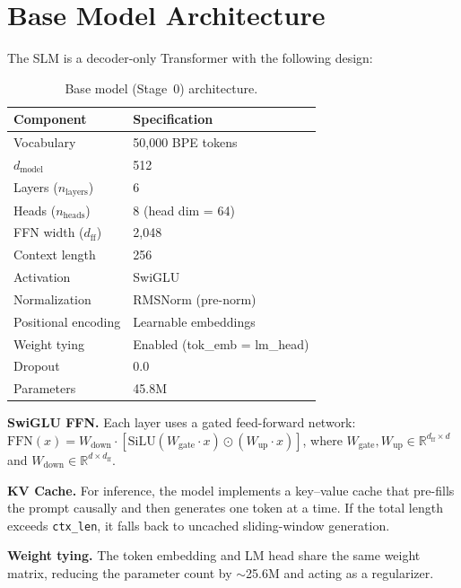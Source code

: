 \section{Base Model Architecture}

The SLM is a decoder-only Transformer with the following design:

\begin{table}[H]
\centering\small
\caption{Base model (Stage~0) architecture.}
\begin{tabular}{ll}
\toprule
\textbf{Component} & \textbf{Specification} \\
\midrule
Vocabulary          & 50{,}000 BPE tokens \\
$d_\text{model}$    & 512 \\
Layers ($n_\text{layers}$) & 6 \\
Heads ($n_\text{heads}$)   & 8 (head dim = 64) \\
FFN width ($d_\text{ff}$)  & 2{,}048 \\
Context length      & 256 \\
Activation          & SwiGLU \\
Normalization       & RMSNorm (pre-norm) \\
Positional encoding & Learnable embeddings \\
Weight tying        & Enabled (tok\_emb = lm\_head) \\
Dropout             & 0.0 \\
Parameters          & 45.8M \\
\bottomrule
\end{tabular}
\end{table}

\textbf{SwiGLU FFN.}
Each layer uses a gated feed-forward network:
$\text{FFN}(x) = W_\text{down} \cdot [\text{SiLU}(W_\text{gate} \cdot x) \odot (W_\text{up} \cdot x)]$,
where $W_\text{gate}, W_\text{up} \in \mathbb{R}^{d_\text{ff} \times d}$ and
$W_\text{down} \in \mathbb{R}^{d \times d_\text{ff}}$.

\textbf{KV Cache.}
For inference, the model implements a key--value cache that pre-fills the prompt
causally and then generates one token at a time.  If the total length exceeds
\texttt{ctx\_len}, it falls back to uncached sliding-window generation.

\textbf{Weight tying.}
The token embedding and LM head share the same weight matrix, reducing the
parameter count by $\sim$25.6M and acting as a regularizer.
